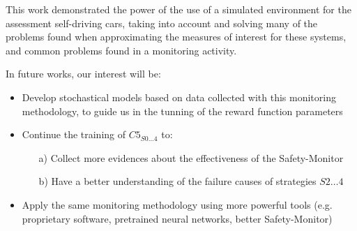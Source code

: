 This work demonstrated the power of the use of a simulated environment for the assessment self-driving cars, taking into account and solving many of the problems found when approximating the measures of interest for these systems, and common problems found in a monitoring activity.

In future works, our interest will be:

\begin{itemize}
	\item Develop stochastical models based on data collected with this monitoring methodology, to guide us in the tunning of the reward function parameters
	\item Continue the training of $C5_{S0\dots 4}$ to:
	\begin{itemize}
		\item[a)] Collect more evidences about the effectiveness of the Safety-Monitor
		\item[b)] Have a better understanding of the failure causes of strategies $S2\dots 4$
	\end{itemize}
	\item Apply the same monitoring methodology using more powerful tools (e.g. proprietary software, pretrained neural networks, better Safety-Monitor)
\end{itemize}
